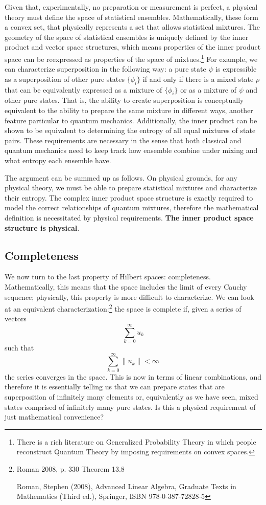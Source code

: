\documentclass[10pt,twocolumn, nofootinbib]{revtex4-2}
\begin{document}
Given that, experimentally, no preparation or measurement is perfect, a physical theory must define the space of statistical ensembles. Mathematically, these form a convex set, that physically represents a set that allows statistical mixtures. The geometry of the space of statistical ensembles is uniquely defined by the inner product and vector space structures, which means properties of the inner product space can be reexpressed as properties of the space of mixtues.\footnote{There is a rich literature on Generalized Probability Theory in which people reconstruct Quantum Theory by imposing requirements on convex spaces.} For example, we can characterize superposition in the following way: a pure state $\psi$ is expressible as a superposition of other pure states $\{\phi_i\}$ if and only if there is a mixed state $\rho$ that can be equivalently expressed as a mixture of $\{\phi_i\}$ or as a mixture of $\psi$ and other pure states. That is, the ability to create superposition is conceptually equivalent to the ability to prepare the same mixture in different ways, another feature particular to quantum mechanics. Additionally, the inner product can be shown to be equivalent to determining the entropy of all equal mixtures of state pairs. These requirements are necessary in the sense that both classical and quantum mechanics need to keep track how ensemble combine under mixing and what entropy each ensemble have.

The argument can be summed up as follows. On physical grounds, for any physical theory, we must be able to prepare statistical mixtures and characterize their entropy. The complex inner product space structure is exactly required to model the correct relationships of quantum mixtures, therefore the mathematical definition is necessitated by physical requirements. \textbf{The inner product space structure is physical}.

\subsection{Completeness}

We now turn to the last property of Hilbert spaces: completeness. Mathematically, this means that the space includes the limit of every Cauchy sequence; physically, this property is more difficult to characterize. We can look at an equivalent characterization:\footnote{Roman 2008, p. 330 Theorem 13.8
	
	Roman, Stephen (2008), Advanced Linear Algebra, Graduate Texts in Mathematics (Third ed.), Springer, ISBN 978-0-387-72828-5} the space is complete if, given a series of vectors
$$ \sum _{k=0}^{\infty }u_{k}$$
such that
$$ \sum _{k=0}^{\infty }\|u_{k}\|<\infty \,$$
the series converges in the space. This is now in terms of linear combinations, and therefore it is essentially telling us that we can prepare states that are superposition of infinitely many elements or, equivalently as we have seen, mixed states comprised of infinitely many pure states. Is this a physical requirement of just mathematical convenience?
\end{document}
